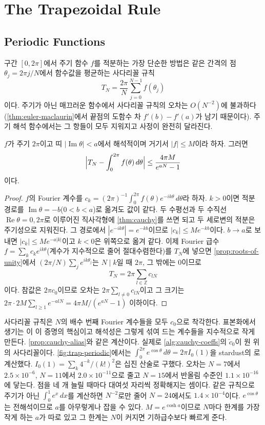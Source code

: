 \section{The Trapezoidal Rule}
\label{sec:trapezoid}

\subsection{Periodic Functions}

구간 $[0,2\pi]$에서 주기 함수 $f$를 적분하는 가장 단순한 방법은 같은 간격의 점 $\theta_j=2\pi j/N$에서 함수값을 평균하는 사다리꼴 규칙
\[
T_N=\frac{2\pi}{N}\sum_{j=0}^{N-1}f(\theta_j)
\]
이다. 주기가 아닌 매끄러운 함수에서 사다리꼴 규칙의 오차는 $O(N^{-2})$에 불과하다(\cref{thm:euler-maclaurin}에서 끝점의 도함수 차 $f'(b)-f'(a)$가 남기 때문이다). 주기 해석 함수에서는 그 항들이 모두 지워지고 사정이 완전히 달라진다.

\begin{theorem}
\label{thm:trapezoid-periodic}
$f$가 주기 $2\pi$이고 띠 $|\operatorname{Im}\theta|<a$에서 해석적이며 거기서 $|f|\le M$이라 하자. 그러면
\[
\Bigl|T_N-\int_0^{2\pi}f(\theta)\,d\theta\Bigr|\le\frac{4\pi M}{e^{aN}-1}
\]
이다.
\end{theorem}

\begin{proof}
$f$의 Fourier 계수를 $c_k=(2\pi)^{-1}\int_0^{2\pi}f(\theta)e^{-ik\theta}\,d\theta$라 하자. $k>0$이면 적분 경로를 $\operatorname{Im}\theta=-b$($0<b<a$)로 옮겨도 값이 같다. 두 수평선과 두 수직선 $\operatorname{Re}\theta=0,2\pi$로 이루어진 직사각형에 \cref{thm:cauchy}를 쓰면 되고 두 세로변의 적분은 주기성으로 지워진다. 그 경로에서 $|e^{-ik\theta}|=e^{-kb}$이므로 $|c_k|\le Me^{-kb}$이다. $b\to a$로 보내면 $|c_k|\le Me^{-a|k|}$이고 $k<0$은 위쪽으로 옮겨 같다. 이제 Fourier 급수 $f=\sum_kc_ke^{ik\theta}$(계수가 지수적으로 줄어 절대수렴한다)를 $T_N$에 넣으면 \cref{prop:roots-of-unity}에서 $(2\pi/N)\sum_je^{ik\theta_j}$는 $N\mid k$일 때 $2\pi$, 그 밖에는 $0$이므로
\[
T_N=2\pi\sum_{l\in\mathbb{Z}}c_{lN}
\]
이다. 참값은 $2\pi c_0$이므로 오차는 $2\pi\sum_{l\ne0}c_{lN}$이고 그 크기는 $2\pi\cdot2M\sum_{l\ge1}e^{-alN}=4\pi M/(e^{aN}-1)$ 이하이다.
\end{proof}

사다리꼴 규칙은 $N$의 배수 번째 Fourier 계수들을 모두 $c_0$으로 착각한다. 표본화에서 생기는 이 이 증명의 핵심이고 해석성은 그렇게 섞여 드는 계수들을 지수적으로 작게 만든다. \cref{prop:cauchy-alias}와 같은 계산이다. 실제로 \cref{alg:cauchy-coeffs}의 $\tilde c_0$이 원 위의 사다리꼴이다. \cref{fig:trap-periodic}에서는 $\int_0^{2\pi}e^{\cos\theta}\,d\theta=2\pi I_0(1)$을 stardust의 로 계산했다. $I_0(1)=\sum_k4^{-k}/(k!)^2$은 십진 산술로 구했다. 오차는 $N=7$에서 $2.5\times10^{-6}$, $N=11$에서 $2.0\times10^{-11}$으로 줄고 $N=15$에서 반올림 수준인 $1.1\times10^{-16}$에 닿는다. 점을 네 개 늘릴 때마다 대여섯 자리씩 정확해지는 셈이다. 같은 규칙으로 주기가 아닌 $\int_0^1e^x\,dx$를 계산하면 $N^{-2}$로만 줄어 $N=24$에서도 $1.4\times10^{-4}$이다. $e^{\cos\theta}$는 전해석이므로 $a$를 아무렇게나 잡을 수 있다. $M=e^{\cosh a}$이므로 $N$마다 한계를 가장 작게 하는 $a$가 따로 있고 그 한계는 $N$이 커지면 기하급수보다 빠르게 준다.


